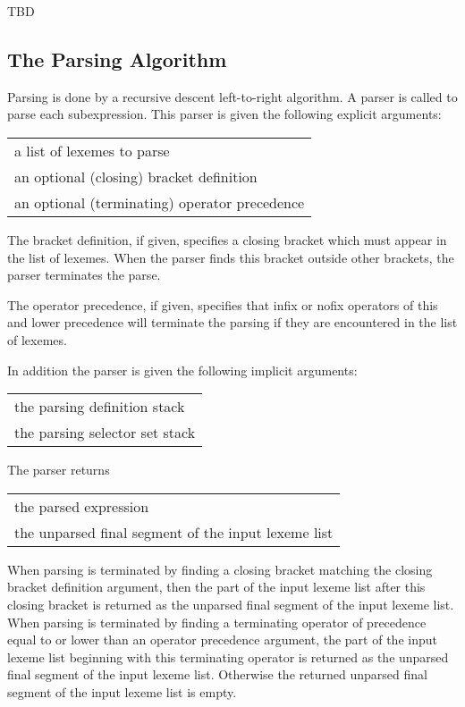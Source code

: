 \documentclass[12pt]{article}
\begin{document}
TBD

\subsection{The Parsing Algorithm}
\label{THE-PARSING-ALGORITHM}
Parsing is done by a recursive descent left-to-right algorithm.
A parser is called to parse each subexpression.  This parser is
given the following explicit arguments:

\begin{center}
\begin{tabular}{l}
a list of lexemes to parse \\
an optional (closing) bracket definition \\
an optional (terminating) operator precedence \\
\end{tabular}
\end{center}

The bracket definition, if given, specifies a closing bracket
which must appear in the list of lexemes.  When the parser
finds this bracket outside other brackets, the parser terminates
the parse.

The operator precedence, if given, specifies that infix or
nofix operators of this and lower precedence will terminate the parsing if
they are encountered in the list of lexemes.

In addition the parser is given the following implicit
arguments:

\begin{center}
\begin{tabular}{l}
the parsing definition stack \\
the parsing selector set stack
\end{tabular}
\end{center}

The parser returns

\begin{center}
\begin{tabular}{l}
the parsed expression \\
the unparsed final segment of the input lexeme list
\end{tabular}
\end{center}

When parsing is terminated by finding a closing bracket matching
the closing bracket definition argument, then the part of the
input lexeme list after this closing bracket is returned as the
unparsed final segment of the input lexeme list.  When parsing is
terminated by finding a terminating operator of precedence equal to or lower
than an operator precedence argument, the part of the input
lexeme list beginning with this terminating operator is returned as the
unparsed final segment of the input lexeme list.  Otherwise the
returned unparsed final segment of the input lexeme list is empty.
\end{document}
